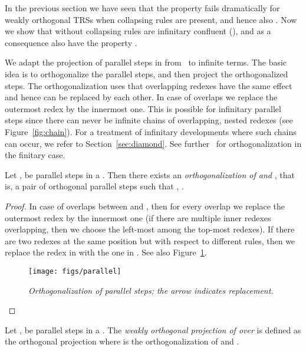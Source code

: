 In the previous section we have seen that the property  
fails dramatically for weakly orthogonal TRSs when collapsing rules are present,
and hence also . 
Now we show that  without collapsing 
rules are infinitary confluent (),
and as a consequence also have the property .

We adapt the projection of parallel steps in 
from~\cite[Section~8.8.4.]{terese:2003} to infinite terms.
The basic idea is to orthogonalize the parallel steps,
and then project the orthogonalized steps.
The orthogonalization uses that overlapping redexes 
have the same effect and hence can be replaced by each other.
In case of overlaps we replace the outermost redex by the innermost one.
This is possible for infinitary parallel steps since there
can never be infinite chains of overlapping, nested redexes (see Figure~\ref{fig:chain}).
For a treatment of infinitary developments where such chains can occur,
we refer to Section~\ref{sec:diamond}.
See further~\cite[Proposition~8.8.23]{terese:2003} for orthogonalization 
in the finitary case.

\begin{proposition}
  Let ,  be parallel steps in a \woTRS{}.
  Then there exists an \emph{orthogonalization  of  and },
  that is, a pair of orthogonal parallel steps such that , .
\end{proposition}

\begin{proof}
In case of overlaps between  and , 
then for every overlap we replace the outermost redex by the innermost one
(if there are multiple inner redexes overlapping, then we choose the left-most among the top-most redexes).
If there are two redexes at the same position but with respect to different rules,
then we replace the redex in  with the one in .
See also Figure~\ref{fig:orthogonalization:parallel}.
\begin{figure}[hpt!]
\begin{center}
  \texttt{[image: figs/parallel]}
\end{center}\vspace{-3ex}
\caption{\textit{Orthogonalization of parallel steps; the arrow indicates replacement.}}
\label{fig:orthogonalization:parallel}
\end{figure}
\end{proof}

\begin{definition}
Let ,  be parallel steps in a \woTRS{}.
The \emph{weakly orthogonal projection  of  over }
is defined as the orthogonal projection 
where  is the orthogonalization of  and .
\end{definition}

